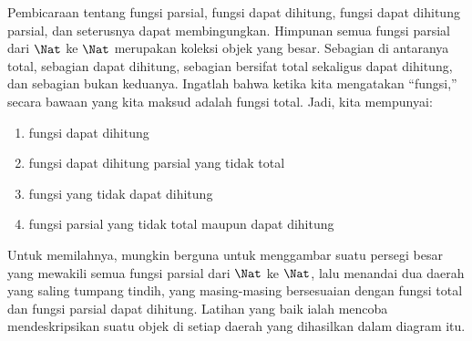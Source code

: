 \documentclass[../../../include/open-logic-section]{subfiles}
\begin{document}
Pembicaraan tentang fungsi parsial, fungsi dapat dihitung, fungsi dapat
dihitung parsial, dan seterusnya dapat membingungkan. Himpunan semua fungsi
parsial dari $\Nat$ ke $\Nat$ merupakan koleksi objek yang besar. Sebagian di
antaranya total, sebagian dapat dihitung, sebagian bersifat total sekaligus
dapat dihitung, dan sebagian bukan keduanya. Ingatlah bahwa ketika kita
mengatakan ``fungsi,'' secara bawaan yang kita maksud adalah fungsi total. Jadi,
kita mempunyai:
\begin{enumerate}
\item fungsi dapat dihitung
\item fungsi dapat dihitung parsial yang tidak total
\item fungsi yang tidak dapat dihitung
\item fungsi parsial yang tidak total maupun dapat dihitung
\end{enumerate}
Untuk memilahnya, mungkin berguna untuk menggambar suatu persegi besar yang
mewakili semua fungsi parsial dari $\Nat$ ke $\Nat$, lalu menandai dua daerah
yang saling tumpang tindih, yang masing-masing bersesuaian dengan fungsi total
dan fungsi parsial dapat dihitung. Latihan yang baik ialah mencoba
mendeskripsikan suatu objek di setiap daerah yang dihasilkan dalam diagram itu.
\end{document}

